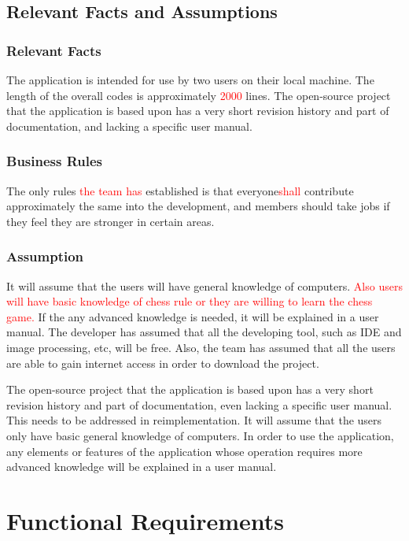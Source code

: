 \documentclass[12pt, titlepage]{article}
\begin{document}
\subsection{Relevant Facts and Assumptions}

\subsubsection{Relevant Facts}
The application is intended for use by two users on their local machine. The length of the overall codes is approximately \textcolor{red}{2000} lines. The open-source project that the application is based upon has a very short revision history and part of documentation, and lacking a specific user manual.

\subsubsection{Business Rules}
The only rules \textcolor{red}{the team has} established is that everyone\textcolor{red}{shall} contribute approximately the same into the development, and members should take jobs if they feel they are stronger in certain areas.

\subsubsection{Assumption}
It will assume that the users will have general knowledge of computers. \textcolor{red}{Also users will have basic knowledge of chess rule or they are willing to learn the chess game.} If the any advanced knowledge is needed, it  will be explained in a user manual. The developer has assumed that all the developing tool, such as IDE and image processing, etc, will be free. Also, the team has assumed that all the users are able to gain internet access in order to download the project.


The open-source project that the application is based upon has a very short revision history and part of documentation, even lacking a specific user manual. This needs to be addressed in reimplementation. It will assume that the users only have basic general knowledge of computers. In order to use the application, any elements or features of the application whose operation requires more advanced knowledge will be explained in a user manual.

\section{Functional Requirements}
\end{document}
